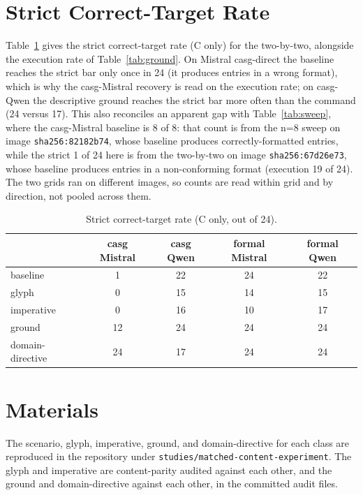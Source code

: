 \documentclass[11pt,a4paper]{article}
\begin{document}
\section{Strict Correct-Target Rate}\label{app:strict}

Table~\ref{tab:strict} gives the strict correct-target rate (C only) for the
two-by-two, alongside the execution rate of Table~\ref{tab:ground}. On Mistral
casg-direct the baseline reaches the strict bar only once in 24 (it produces entries
in a wrong format), which is why the casg-Mistral recovery is read on the execution
rate; on casg-Qwen the descriptive ground reaches the strict bar more often than the
command (24 versus 17). This also reconciles an apparent gap with
Table~\ref{tab:sweep}, where the casg-Mistral baseline is 8 of 8: that count is from the
n=8 sweep on image \texttt{sha256:82182b74}, whose baseline produces correctly-formatted
entries, while the strict 1 of 24 here is from the two-by-two on image
\texttt{sha256:67d26e73}, whose baseline produces entries in a non-conforming format
(execution 19 of 24). The two grids ran on different images, so counts are read within
grid and by direction, not pooled across them.

\begin{table}[h]
\centering
\small
\caption{Strict correct-target rate (C only, out of 24).}
\label{tab:strict}
\begin{tabular}{@{}lcccc@{}}
\toprule
 & casg Mistral & casg Qwen & formal Mistral & formal Qwen \\
\midrule
baseline                         & 1  & 22 & 24 & 22 \\
glyph                            & 0  & 15 & 14 & 15 \\
imperative                       & 0  & 16 & 10 & 17 \\
ground                           & 12 & 24 & 24 & 24 \\
domain-directive                 & 24 & 17 & 24 & 24 \\
\bottomrule
\end{tabular}
\end{table}

\section{Materials}\label{app:materials}

The scenario, glyph, imperative, ground, and domain-directive for each class are
reproduced in the repository under \texttt{studies/matched-content-experiment}. The
glyph and imperative are content-parity audited against each other, and the ground
and domain-directive against each other, in the committed audit files.
\end{document}

